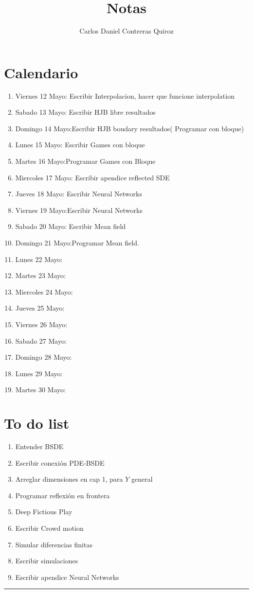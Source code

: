 \documentclass{article}
\title{Notas}
\author{Carlos Daniel Contreras Quiroz}
\newcommand{\HRule}{\rule{\linewidth}{0.5mm}}
\begin{document}
	\maketitle%
	\vspace{5mm}
	\section*{Calendario}
	\begin{enumerate}
		\item Viernes 12 Mayo: Escribir Interpolacion, hacer que funcione interpolation
		\item Sabado 13 Mayo: Escribir HJB libre resultados
		\item Domingo 14 Mayo:Escribir HJB boudary resultados( Programar con bloque)
		\item Lunes 15 Mayo: Escribir Games con bloque
		\item Martes 16 Mayo:Programar Games con Bloque
		\item Miercoles 17 Mayo: Escribir apendice reflected SDE
		\item Jueves 18 Mayo: Escribir Neural Networks
		\item Viernes 19 Mayo:Escribir Neural Networks
		\item Sabado 20 Mayo: Escribir Mean field
		\item Domingo 21 Mayo:Programar Mean field.
		\item Lunes 22 Mayo: 
		\item Martes 23 Mayo:
		\item Miercoles 24 Mayo:
		\item Jueves 25 Mayo: 
		\item Viernes 26 Mayo:
		\item Sabado 27 Mayo:
		\item Domingo 28 Mayo:
		\item Lunes 29 Mayo:
		\item Martes 30 Mayo:
		
	\end{enumerate}
	\section*{To do list}
	\begin{enumerate}
		\item Entender BSDE \greencheck
		\item Escribir conexión PDE-BSDE \greencheck
		\item Arreglar dimensiones en cap 1, para $Y$ general
		\item Programar reflexión en frontera \greencheck
		\item Deep Fictious Play
		\item Escribir Crowd motion
		\item Simular diferencias finitas
		\item Escribir simulaciones
		\item Escribir apendice Neural Networks
	\end{enumerate}
    \HRule\par
\end{document}
